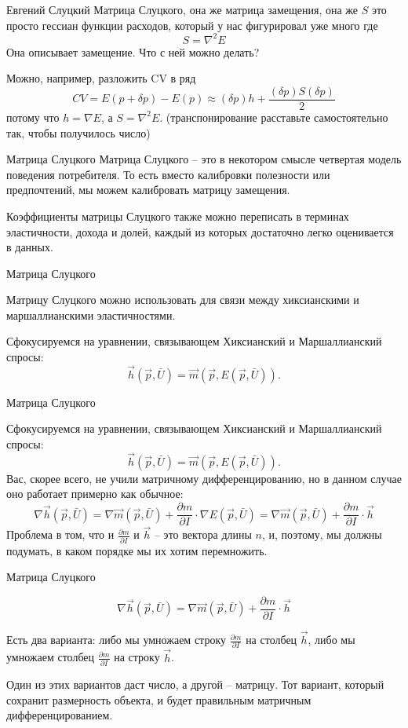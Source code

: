 \documentclass{beamer}
\begin{document}
\begin{frame}{Евгений Слуцкий}
Матрица Слуцкого, она же матрица замещения, она же $S$ это просто гессиан функции расходов, который у нас фигурировал уже много где
$$ S = \nabla^2 E $$
Она описывает замещение. Что с ней можно делать?

Можно, например, разложить CV в ряд
$$ CV = E(p + \delta p) - E(p) \approx (\delta p) h + \frac{(\delta p) S (\delta p)}{2}$$
потому что $h = \nabla E$, а $S = \nabla^2 E$. (транспонирование расставьте самостоятельно так, чтобы получилось число)
\end{frame}

\begin{frame}{Матрица Слуцкого}
Матрица Слуцкого – это в некотором смысле четвертая модель поведения потребителя. То есть вместо калибровки полезности или предпочтений, мы можем калибровать матрицу замещения. 

Коэффициенты матрицы Слуцкого также можно переписать в терминах эластичности, дохода и долей, каждый из которых достаточно легко оценивается в данных. 
\end{frame}

\begin{frame}{Матрица Слуцкого}

Матрицу Слуцкого можно использовать для связи между хиксианскими и маршаллианскими эластичностями.

Сфокусируемся на уравнении, связывающем Хиксианский и Маршаллианский спросы:
$$\vec h (\vec p, \bar U) = \vec m(\vec p,  E(\vec p, \bar U)).$$

\end{frame}

\begin{frame}{Матрица Слуцкого}

Сфокусируемся на уравнении, связывающем Хиксианский и Маршаллианский спросы:
$$\vec h (\vec p, \bar U) = \vec m(\vec p,  E(\vec p, \bar U)).$$
Вас, скорее всего, не учили матричному дифференцированию, но в данном случае оно работает примерно как обычное:
$$ \nabla \vec h(\vec p,  \bar U) = \nabla \vec m(\vec p,  \bar U) + \frac{\partial m}{\partial I} \cdot \nabla E(\vec p, \bar U) = \nabla \vec m(\vec p,  \bar U) + \frac{\partial m}{\partial I} \cdot \vec h $$
Проблема в том, что и $\frac{\partial m}{\partial I}$ и $\vec h$ – это вектора длины $n$, и, поэтому, мы должны подумать, в каком порядке мы их хотим перемножить. 

\end{frame}

\begin{frame}{Матрица Слуцкого}

$$ \nabla \vec h(\vec p,  \bar U) = \nabla \vec m(\vec p,  \bar U) + \frac{\partial m}{\partial I} \cdot \vec h $$

Есть два варианта: либо мы умножаем строку $\frac{\partial m}{\partial I}$ на столбец $\vec h$, либо мы умножаем столбец $\frac{\partial m}{\partial I}$ на строку $\vec h$. 

Один из этих вариантов даст число, а другой – матрицу. Тот вариант, который сохранит размерность объекта, и будет правильным матричным дифференцированием. 

\end{frame}
\end{document}
